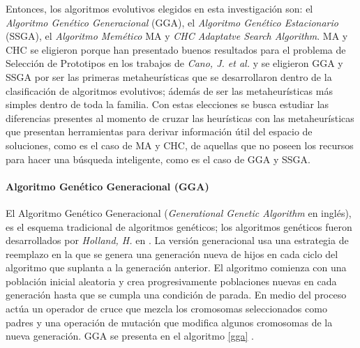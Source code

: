Entonces, los algoritmos evolutivos elegidos en esta investigación son: el \emph{Algoritmo Genético Generacional} (GGA), el \emph{Algoritmo Genético Estacionario} (SSGA), el \emph{Algoritmo Memético} MA y \emph{CHC Adaptatve Search Algorithm}. MA y CHC se eligieron porque han presentado buenos resultados para el problema de Selección de Prototipos en los trabajos de \emph{Cano, J. et al.} \cite{garcia2012prototype, garcia2008memetic} y se eligieron GGA y SSGA por ser las primeras metaheurísticas que se desarrollaron dentro de la clasificación de algoritmos evolutivos; ádemás de ser las metaheurísticas más simples dentro de toda la familia. Con estas elecciones se busca estudiar las diferencias presentes al momento de cruzar las heurísticas con las metaheurísticas que presentan herramientas para derivar información útil del espacio de soluciones, como es el caso de MA y CHC, de aquellas que no poseen los recursos para hacer una búsqueda inteligente, como es el caso de GGA y SSGA.  

\paragraph{Algoritmo Genético Generacional (GGA)}

El Algoritmo Genético Generacional (\emph{Generational Genetic Algorithm} en inglés), es el esquema tradicional de algoritmos genéticos; los algoritmos genéticos fueron desarrollados por \emph{Holland, H.} en \cite{holland1975adaptation}. La versión generacional usa una estrategia de reemplazo en la que se genera una generación nueva de hijos en cada ciclo del algoritmo que suplanta a la generación anterior. El algoritmo comienza con una población inicial aleatoria y crea progresivamente poblaciones nuevas en cada generación hasta que se cumpla una condición de parada. En medio del proceso actúa un operador de cruce que mezcla los cromosomas seleccionados como padres y una operación de mutación que modifica algunos cromosomas de la nueva generación. GGA se presenta en el algoritmo \ref{gga} \cite{flores2014metaheuristics}.

